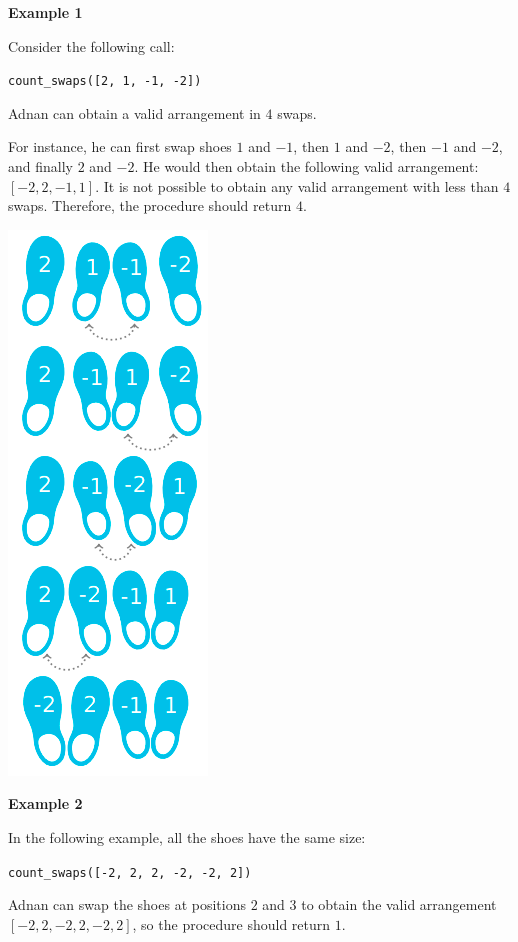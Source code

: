 \textbf{Example 1}

Consider the following call:

\texttt{count\_swaps([2, 1, -1, -2])}

Adnan can obtain a valid arrangement in $4$ swaps.

For instance, he can first swap shoes $1$ and $-1$, then $1$ and $-2$, then $-1$ and $-2$, and finally $2$ and $-2$.
He would then obtain the following valid arrangement: $[-2, 2, -1, 1]$.
It is not possible to obtain any valid arrangement with less than $4$ swaps.
Therefore, the procedure should return $4$.

\includegraphics{1.png}

\textbf{Example 2}

In the following example, all the shoes have the same size:


\texttt{count\_swaps([-2, 2, 2, -2, -2, 2])}


Adnan can swap the shoes at positions $2$ and $3$ to obtain the valid arrangement $[-2, 2, -2, 2, -2, 2]$, so the procedure should return $1$.
